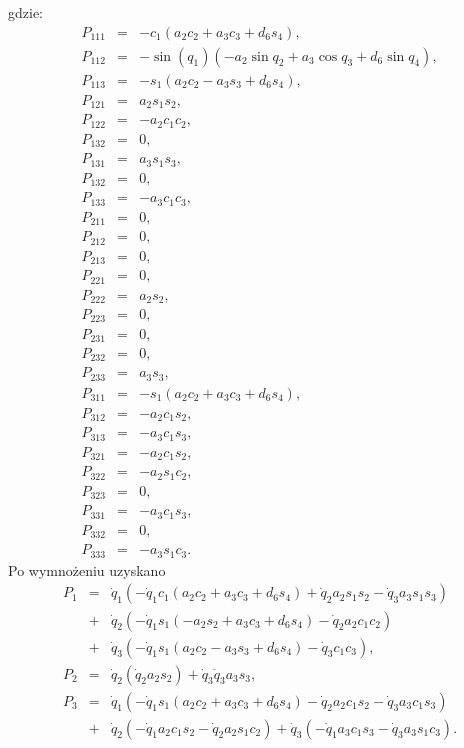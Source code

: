 \documentclass[eng,printmode]{mgr}
\begin{document}
      
gdzie:
\begin{eqnarray}
P_{111}&=&-c_1(a_2c_2+a_3c_3+d_6s_4),\\ \nonumber
P_{112}&=&-\sin(q_1)(-a_2\sin{q_2}+a_3\cos{q_3}+d_6\sin{q_4}),\\ \nonumber
P_{113}&=&-s_1(a_2c_2-a_3s_3+d_6s_4),\\ \nonumber
P_{121}&=&a_2s_1s_2,\\ \nonumber
P_{122}&=&-a_2c_1c_2,\\ \nonumber
P_{132}&=&0,\\ \nonumber
P_{131}&=&a_3s_1s_3,\\ \nonumber
P_{132}&=&0,\\ \nonumber
P_{133}&=&-a_3c_1c_3,\\ \nonumber
P_{211}&=&0,\\ \nonumber
P_{212}&=&0,\\ \nonumber
P_{213}&=&0,\\ \nonumber
P_{221}&=&0,\\ \nonumber
P_{222}&=&a_2s_2,\\ \nonumber
P_{223}&=&0,\\ \nonumber
P_{231}&=&0,\\ \nonumber
P_{232}&=&0,\\ \nonumber
P_{233}&=&a_3s_3,\\ \nonumber
P_{311}&=&-s_1(a_2c_2+a_3c_3+d_6s_4),\\ \nonumber
P_{312}&=&-a_2c_1s_2,\\ \nonumber
P_{313}&=&-a_3c_1s_3,\\ \nonumber
P_{321}&=&-a_2c_1s_2,\\ \nonumber
P_{322}&=&-a_2s_1c_2,\\ \nonumber
P_{323}&=&0,\\ \nonumber
P_{331}&=&-a_3c_1s_3,\\ \nonumber
P_{332}&=&0,\\ \nonumber
P_{333}&=&-a_3s_1c_3.
\end{eqnarray}
Po wymnożeniu uzyskano
\begin{eqnarray}
P_1&=&\dot{q}_1(-\dot{q}_1c_1(a_2c_2+a_3c_3+d_6s_4)+\dot{q}_2a_2s_1s_2-\dot{q}_3a_3s_1s_3)\\ \nonumber
&+&\dot{q}_2(-\dot{q}_1s_1(-a_2s_2+a_3c_3+d_6s_4)-\dot{q}_2a_2c_1c_2)\\ \nonumber
&+&\dot{q}_3(-\dot{q}_1s_1(a_2c_2-a_3s_3+d_6s_4)-\dot{q}_3c_1c_3),\\  \nonumber
P_2&=&\dot{q}_2(\dot{q}_2a_2s_2)+\dot{q}_3\dot{q}_3a_3s_3,\\  \nonumber
P_3&=&\dot{q}_1(-\dot{q}_1s_1(a_2c_2+a_3c_3+d_6s_4)-\dot{q}_2a_2c_1s_2-\dot{q}_3a_3c_1s_3)\\ \nonumber
&+&\dot{q}_2(-\dot{q}_1a_2c_1s_2-\dot{q}_2a_2s_1c_2)+\dot{q}_3(-\dot{q}_1a_3c_1s_3-\dot{q}_3a_3s_1c_3).
\end{eqnarray}
\end{document}
